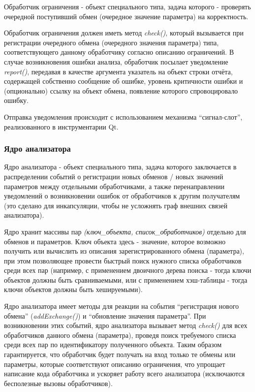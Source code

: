 Обработчик ограничения - объект специального типа, задача которого - проверять 
очередной поступивший обмен (очередное значение параметра) на корректность.

Обработчик ограничения должен иметь метод \textit{check()}, который вызывается 
при регистрации очередного обмена (очередного значения параметра) типа, 
соответствующего данному обработчику согласно описанию ограничений. В случае 
возникновения ошибки анализа, обработчик посылает уведомление 
\textit{report()}, передавая в качестве аргумента указатель на объект строки 
отчёта, содержащей собственно сообщение об ошибке, уровень критичности ошибки и 
(опционально) ссылку на объект обмена, появление которого спровоцировало ошибку.

Отправка уведомления происходит с использованием механизма ``сигнал-слот'', 
реализованного в инструментарии Qt.

\subsubsection{Ядро анализатора}

Ядро анализатора - объект специального типа, задача которого заключается в 
распределении событий о регистрации новых обменов / новых значений параметров 
между отдельными обработчиками, а также перенаправлении уведомлений о 
возникновении ошибок от обработчиков к другим получателям (это сделано для 
инкапсуляции, чтобы не усложнять граф внешних связей анализатора).

Ядро хранит массивы пар \textit{(ключ\_объекта, список\_обработчиков)} 
отдельно для обменов и параметров. Ключ объекта здесь - значение, которое 
возможно получить или вычислить из описания зарегистрированного обмена 
(параметра), при этом позволяющее провести быстрый поиск нужного списка 
обработчиков среди всех пар (например, с применением двоичного дерева поиска - 
тогда ключи объектов должны быть сравниваемыми, или с применением хэш-таблицы - 
тогда ключи объектов должны быть хешируемыми).

Ядро анализатора имеет методы для реакции на события ``регистрация нового 
обмена'' (\textit{addExchange()}) и ``обновление значения параметра''. При 
возникновении этих событий, ядро анализатора вызывает метод \textit{check()} 
для 
всех обработчиков данного обмена (параметра), проведя поиск требуемого списка 
среди всех пар по идентификатору полученного объекта. Таким 
образом гарантируется, что обработчик будет получать на вход только те обмены 
или параметры, которые соответствуют описанию ограничения, что упрощает 
написание кода обработчика и ускоряет работу всего анализатора 
(исключаются бесполезные вызовы обработчиков).


